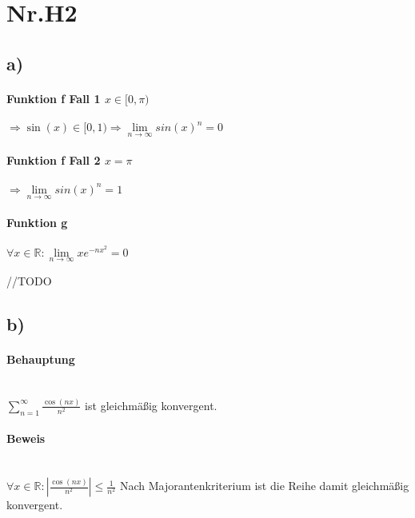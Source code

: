 \section*{Nr.H2}

\subsection*{a)}

\paragraph*{Funktion f Fall 1 $ x \in [0,\pi) $}
$ \Rightarrow \sin(x) \in [0,1) \Rightarrow  \lim\limits_{n \to \infty} sin(x)^{n} = 0 $

\paragraph*{Funktion f Fall 2 $ x = \pi $}
$ \Rightarrow \lim\limits_{n \to \infty} sin(x)^{n} = 1 $


\paragraph*{Funktion g}
$\forall x \in \mathbb{R} : \lim\limits_{n \to \infty}xe^{-nx^{2}} = 0$
\begin{large}
//TODO 
\end{large}


\subsection*{b)}

\paragraph*{Behauptung} ~\\
$ \sum\limits_{n=1}^\infty \frac{\cos(nx)}{n^{2}} $ ist gleichmäßig konvergent.

\paragraph*{Beweis} ~\\
$ \forall x \in \mathbb{R} : |\frac{\cos(nx)}{n^{2}}| \leq \frac{1}{n^{2}} $
Nach Majorantenkriterium ist die Reihe damit gleichmäßig konvergent.

